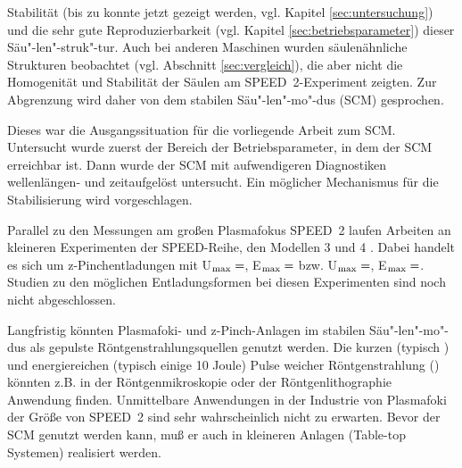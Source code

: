Stabilität (bis zu  konnte jetzt gezeigt werden,
vgl. Kapitel \vref{sec:untersuchung}) und die sehr gute
Reproduzierbarkeit (vgl. Kapitel \vref{sec:betriebsparameter})
dieser Säu"-len"-struk"-tur. Auch bei anderen Maschinen wurden
säulenähnliche Strukturen beobachtet (vgl. Abschnitt
\vref{sec:vergleich}), die aber nicht die Homogenität und
Stabilität der Säulen am SPEED~2-Experiment zeigten. Zur
Abgrenzung wird daher von dem stabilen Säu"-len"-mo"-dus (SCM)
gesprochen.
\par
Dieses war die Ausgangssituation für die vorliegende Arbeit zum SCM.
Untersucht wurde zuerst der Bereich der Betriebsparameter, in dem der
SCM erreichbar ist. Dann wurde der SCM mit aufwendigeren Diagnostiken
wellenlängen- und zeitaufgelöst untersucht. Ein möglicher Mechanismus
für die Stabilisierung \cite{kies:99} wird vorgeschlagen.
\par
Parallel zu den Messungen am großen Plasmafokus SPEED~2 laufen Arbeiten
an kleineren Experimenten der SPEED-Reihe, den Modellen 3 und 4
\cite{raacke:phd}. Dabei handelt es sich um z-Pinchentladungen mit
U$_{\rm max}=$, E$_{\rm max}=$ bzw.
U$_{\rm max}=$, E$_{\rm max}=$. Studien zu
den möglichen Entladungsformen bei diesen Experimenten sind noch nicht
abgeschlossen.
\par
Langfristig könnten Plasmafoki- und z-Pinch-Anlagen im stabilen
Säu"-len"-mo"-dus als gepulste Röntgenstrahlungsquellen genutzt
werden. Die kurzen (typisch ) und energiereichen
(typisch einige 10 Joule) Pulse weicher Röntgenstrahlung
() könnten z.B. in der
Röntgenmikroskopie oder der Röntgenlithographie Anwendung finden.
Unmittelbare Anwendungen in der Industrie von Plasmafoki der Größe
von SPEED~2 sind sehr wahrscheinlich nicht zu erwarten. Bevor der
SCM genutzt werden kann, muß er auch in kleineren Anlagen
(Table-top Systemen) realisiert werden.
